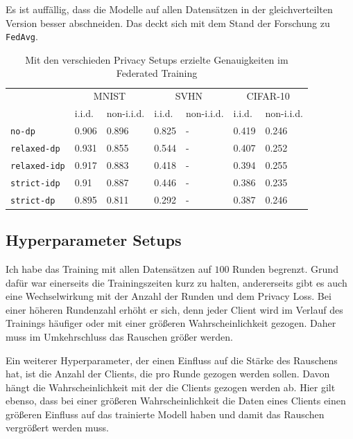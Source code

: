 Es ist auffällig, dass die Modelle auf allen Datensätzen in der gleichverteilten Version besser abschneiden. Das deckt sich mit dem Stand der Forschung zu \texttt{FedAvg}.

\begin{table}
	\centering
	\begin{tabular}{lp{4em}p{4em}p{4em}p{4em}p{4em}p{4em}}
		\toprule 
	 	& \multicolumn{2}{c}{MNIST} & \multicolumn{2}{c}{SVHN} & \multicolumn{2}{c}{CIFAR-10} \\
		\cmidrule(lr){2-3}\cmidrule(lr){4-5}\cmidrule(lr){6-7}
		& i.i.d. & non-i.i.d. & i.i.d. & non-i.i.d. & i.i.d. & non-i.i.d. \\
		\midrule
		\texttt{no-dp} & 0.906 & 0.896 & 0.825 & - & 0.419 & 0.246 \\
		\texttt{relaxed-dp} & 0.931 & 0.855 & 0.544 & - & 0.407 & 0.252 \\
		\texttt{relaxed-idp} & 0.917 & 0.883 & 0.418 & - & 0.394 & 0.255 \\
		\texttt{strict-idp} & 0.91 & 0.887 & 0.446 & - & 0.386 & 0.235 \\
		\texttt{strict-dp} & 0.895 & 0.811 & 0.292 & - & 0.387 & 0.246 \\
		\bottomrule
	\end{tabular}
	\caption{Mit den verschieden Privacy Setups erzielte Genauigkeiten im Federated Training}
	\label{tab:all-fed-results}
\end{table}

\subsection{Hyperparameter Setups}
Ich habe das Training mit allen Datensätzen auf $100$ Runden begrenzt. Grund dafür war einerseits die Trainingszeiten kurz zu halten, andererseits gibt es auch eine Wechselwirkung mit der Anzahl der Runden und dem Privacy Loss. Bei einer höheren Rundenzahl erhöht er sich, denn jeder Client wird im Verlauf des Trainings häufiger oder mit einer größeren Wahrscheinlichkeit gezogen. Daher muss im Umkehrschluss das Rauschen größer werden. 

Ein weiterer Hyperparameter, der einen Einfluss auf die Stärke des Rauschens hat, ist die Anzahl der Clients, die pro Runde gezogen werden sollen. Davon hängt die Wahrscheinlichkeit mit der die Clients gezogen werden ab. Hier gilt ebenso, dass bei einer größeren Wahrscheinlichkeit die Daten eines Clients einen größeren Einfluss auf das trainierte Modell haben und damit das Rauschen vergrößert werden muss.


